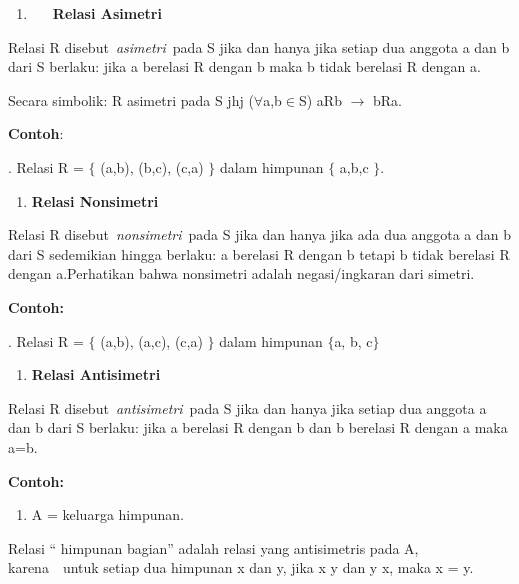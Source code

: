 \documentclass[11pt,fleqn]{book} %
\begin{document}
\begin{enumerate}
\item  ~~~\textbf{Relasi Asimetri}
\end{enumerate}

\noindent \textbf{}

\noindent Relasi R disebut~\textit{asimetri}~pada S jika dan hanya jika setiap dua anggota a dan b dari S berlaku: jika a berelasi R dengan b maka b tidak berelasi R dengan a.

\noindent Secara simbolik: R asimetri pada S jhj ($\mathrm{\forall }$a,b$\mathrm{\in }$S) aRb $\mathrm{\to}$ bRa.

\noindent 

\noindent \textbf{Contoh}:

\noindent 

. Relasi R = $\{$ (a,b), (b,c), (c,a) $\}$ dalam himpunan $\{$ a,b,c $\}$.

\noindent \textbf{}

\begin{enumerate}
\item \textbf{ Relasi Nonsimetri}
\end{enumerate}

\noindent Relasi R disebut~\textit{nonsimetri}~pada S jika dan hanya jika ada dua anggota a dan b dari S sedemikian hingga berlaku: a berelasi R dengan b tetapi b tidak berelasi R dengan a.Perhatikan bahwa nonsimetri adalah negasi/ingkaran dari simetri.

\noindent \textbf{Contoh:}

. Relasi R = $\{$ (a,b), (a,c), (c,a) $\}$ dalam himpunan $\{$a, b, c$\}$

\noindent \textbf{}

\begin{enumerate}
\item \textbf{ Relasi Antisimetri}
\end{enumerate}

\noindent Relasi R disebut~\textit{antisimetri}~pada S jika dan hanya jika setiap dua anggota a dan b dari S berlaku: jika a berelasi R dengan b dan b berelasi R dengan a maka a=b.

\noindent \textbf{Contoh:}

\begin{enumerate}
\item \textbf{ }A = keluarga himpunan. 
\end{enumerate}

\noindent Relasi `` himpunan bagian'' adalah relasi yang antisimetris pada A, karena~~untuk setiap dua himpunan x dan y, jika x y dan y x, maka x = y.
\end{document}

